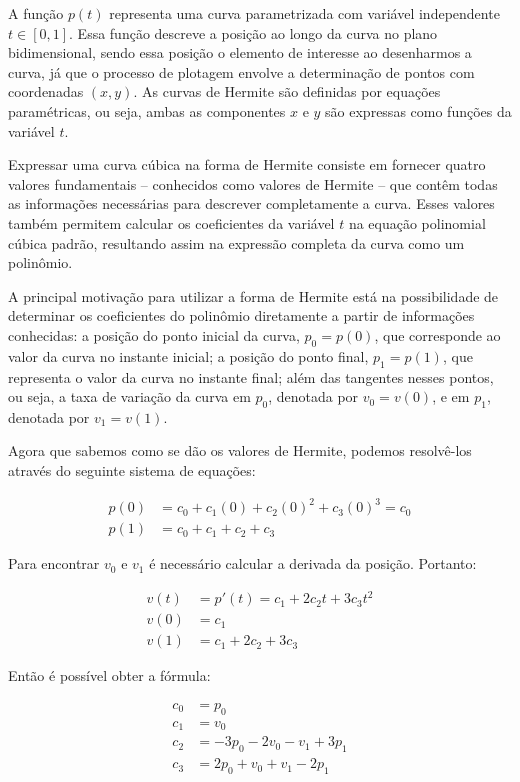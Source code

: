 A função $p(t)$ representa uma curva parametrizada com variável independente \( t \in [0,1] \). Essa função descreve a posição ao longo da curva no plano bidimensional, sendo essa posição o elemento de interesse ao desenharmos a curva, já que o processo de plotagem envolve a determinação de pontos com coordenadas $(x, y)$. As curvas de Hermite são definidas por equações paramétricas, ou seja, ambas as componentes $x$ e  $y$ são expressas como funções da variável $t$.

Expressar uma curva cúbica na forma de Hermite consiste em fornecer quatro valores fundamentais -- conhecidos como valores de Hermite -- que contêm todas as informações necessárias para descrever completamente a curva. Esses valores também permitem calcular os coeficientes da variável \( t \) na equação polinomial cúbica padrão, resultando assim na expressão completa da curva como um polinômio.

A principal motivação para utilizar a forma de Hermite está na possibilidade de determinar os coeficientes do polinômio diretamente a partir de informações conhecidas: a posição do ponto inicial da curva, \( p_0 = p(0) \), que corresponde ao valor da curva no instante inicial; a posição do ponto final, \( p_1 = p(1) \), que representa o valor da curva no instante final; além das tangentes nesses pontos, ou seja, a taxa de variação da curva em \( p_0 \), denotada por \( v_0 = v(0) \), e em \( p_1 \), denotada por \( v_1 = v(1) \).


Agora que sabemos como se dão os valores de Hermite, podemos resolvê-los através do seguinte sistema de equações:

\begin{align}
    p(0) &= c_0 + c_1(0) + c_2(0)^2 + c_3(0)^3 = c_0 \\
    p(1) &= c_0 + c_1 + c_2 + c_3
\end{align}


Para encontrar $v_0$ e $v_1$ é necessário calcular a derivada da posição. Portanto:

\begin{align}
    v(t) &= p'(t) = c_1 + 2c_2t + 3c_3t^2\\
    v(0) &= c_1\\
    v(1) &= c_1 + 2c_2 + 3c_3
\end{align}

Então é possível obter a fórmula:

\begin{align}
    c_0 &= p_0\\
    c_1 &= v_0\\
    c_2 &= -3p_0 - 2v_0 - v_1 + 3p_1\\
    c_3 &= 2p_0 + v_0 + v_1 - 2p_1
\end{align}

